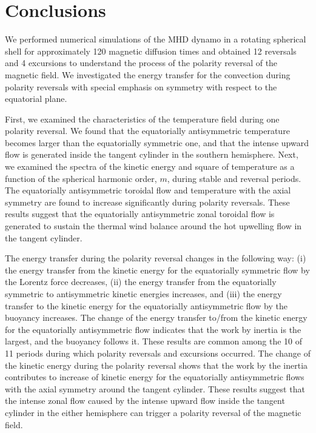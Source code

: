 \section{Conclusions}
\label{section:conclusions}

We performed numerical simulations of the MHD dynamo in a rotating spherical shell for approximately %
120 magnetic diffusion times 
and obtained 12 reversals and 4 excursions to understand the process of the polarity reversal of the magnetic field. 
We investigated the energy transfer for the convection during polarity reversals with special emphasis on symmetry with respect to the equatorial plane.

First, we examined the characteristics of the temperature field during one polarity reversal. 
We found that the equatorially antisymmetric temperature becomes larger than the equatorially symmetric one, and that the intense upward flow is generated inside the tangent cylinder in the southern hemisphere. 
Next, we examined the spectra of the kinetic energy and square of temperature as a function of the spherical harmonic order, $m$, %
{\color{teal}
during stable and reversal periods.}
The equatorially antisymmetric toroidal flow and temperature with the axial symmetry are found to increase significantly during polarity reversals.
These results suggest that the equatorially antisymmetric zonal toroidal flow is generated to sustain the thermal wind balance around the hot upwelling flow in the tangent cylinder.

The energy transfer during the polarity reversal changes in the following way: 
(i) the energy transfer from the kinetic energy for the equatorially symmetric flow by the Lorentz force decreases, 
(ii) the energy transfer from the equatorially symmetric to antisymmetric kinetic energies increases, and (iii) the energy transfer to the kinetic energy for the equatorially antisymmetric flow by the buoyancy increases. 
The change of the energy transfer to/from the kinetic energy for the equatorially antisymmetric flow indicates that the work by inertia is the largest, and the buoyancy follows it. 
These results are common among the 10 of 11 periods during which polarity reversals and excursions occurred. 
The change of the kinetic energy during the polarity reversal shows that the work by the inertia contributes to increase of kinetic energy for the equatorially antisymmetric flows with the axial symmetry around the tangent cylinder. 
These results suggest that the intense zonal flow caused by the intense upward flow inside the tangent cylinder in the either hemisphere can trigger a polarity reversal of the magnetic field.


